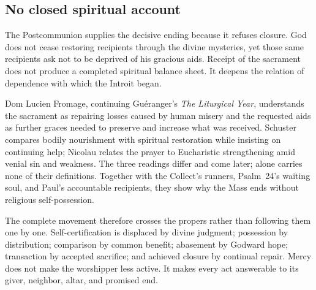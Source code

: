 \subsection*{No closed spiritual account}

The Postcommunion supplies the decisive ending because it refuses closure.
God does not cease restoring recipients through the divine mysteries, yet
those same recipients ask not to be deprived of his gracious aids.  Receipt
of the sacrament does not produce a completed spiritual balance sheet.  It
deepens the relation of dependence with which the Introit began.

Dom Lucien Fromage, continuing Guéranger's \emph{The Liturgical Year},
understands the sacrament as repairing losses caused by human
misery and the requested aids as further graces needed to preserve and
increase what was received.  Schuster compares bodily nourishment with
spiritual restoration while insisting on continuing help; Nicolau relates the
prayer to Eucharistic strengthening amid venial sin and weakness.  The three
readings differ and come later;  alone carries none of their
definitions.  Together with the Collect's runners, Psalm~24's
waiting soul, and Paul's accountable recipients, they show why the Mass ends
without religious self-possession.

The complete movement therefore crosses the propers rather than following
them one by one.  Self-certification is displaced by divine judgment; possession
by distribution; comparison by common benefit; abasement by Godward hope;
transaction by accepted sacrifice; and achieved closure by continual repair.
Mercy does not make the worshipper less active.  It makes every act
answerable to its giver, neighbor, altar, and promised end.
